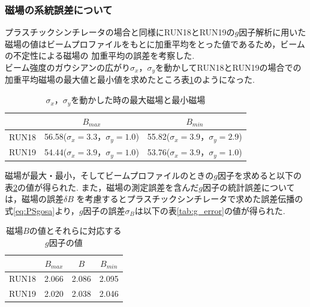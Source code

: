 
\subsubsection{磁場の系統誤差について}

プラスチックシンチレータの場合と同様にRUN18とRUN19の$g$因子解析に用いた磁場の値はビームプロファイルをもとに加重平均をとった値であるため，ビームの不定性による磁場の
加重平均の誤差を考察した.\\
ビーム強度のガウシアンの広がり$\sigma_{x}，\sigma_{y}$を動かしてRUN18とRUN19の場合での加重平均磁場の最大値と最小値を求めたところ表\ref{tab:mag_max_min}のようになった.

\begin{table}[H]
  \caption{$\sigma_{x}，\sigma_{y}$を動かした時の最大磁場と最小磁場}
  \centering
  \begin{tabular}{ccc}\toprule%
         & $B_{max}$ &  $B_{min}$   \\ \midrule
    RUN18 & 56.58\;($\sigma_{x}=3.3，\sigma_{y}=1.0$) & 55.82\;($\sigma_{x}=3.9，\sigma_{y}=2.9$)  \\
         RUN19 & 54.44\;($\sigma_{x}=3.9，\sigma_{y}=1.0$) & 53.76\;($\sigma_{x}=3.9，\sigma_{y}=1.0$) \\ \bottomrule
  \end{tabular}
  \label{tab:mag_max_min}
\end{table}

磁場が最大・最小，そしてビームプロファイルのときの$g$因子を求めると以下の表\ref{tab:mag_g}の値が得られた.
また，磁場の測定誤差を含んだ$g$因子の統計誤差については，磁場の誤差$\delta B$
を考慮するとプラスチックシンチレータで求めた誤差伝播の式\ref{eq:PSgosa}より，$g$因子の誤差$\sigma_{B}$は以下の表\ref{tab:g_error}の値が得られた.

\begin{table}[H]
  \caption{磁場$B$の値とそれらに対応する$g$因子の値}
  \centering
  \begin{tabular}{cccc}\toprule%
    & $B_{max}$ & $B$ & $B_{min}$  \\ \midrule
    RUN18 & 2.066 & 2.086 & 2.095 \\
    RUN19 & 2.020 & 2.038 & 2.046 \\ \bottomrule
  \end{tabular}
  \label{tab:mag_g}
\end{table}


